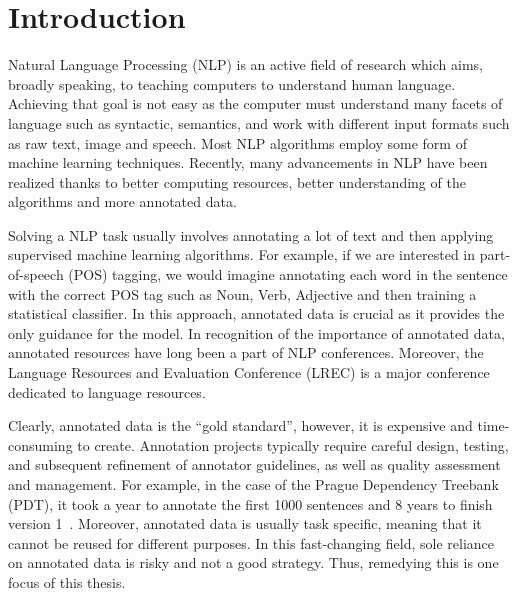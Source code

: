 \documentclass[12pt,twoside,final,hidelinks]{ltthesis}
\theoremstyle{definition}
\begin{document}


\hsp




\chapter{Introduction}
\label{chap:introduction}
Natural Language Processing (NLP) is an active field of research which aims, broadly speaking, to teaching computers to understand human language. Achieving that goal is not easy as the computer must understand many facets of language such as syntactic, semantics, and work with different input formats such as raw text, image and speech. Most NLP algorithms employ some form of machine learning techniques. Recently, many advancements in NLP have been realized thanks to better computing resources, better understanding of the algorithms and more annotated data. 

Solving a NLP task usually involves annotating a lot of text and then applying supervised machine learning algorithms. For example, if we are interested in part-of-speech (POS) tagging, we would imagine annotating each word in the sentence with the correct POS tag such as Noun, Verb, Adjective and then training a statistical classifier. In this approach, annotated data is crucial as it provides the only guidance for the model. In recognition of the importance of annotated data, annotated resources have long been a part of NLP conferences. Moreover, the Language Resources and Evaluation Conference (LREC) is a major conference dedicated to language resources. 

Clearly, annotated data is the ``gold standard'', however, it is expensive and time-consuming to create. Annotation projects typically require careful design, testing, and subsequent refinement of annotator guidelines, as well as quality assessment and management. For example, in the case of the Prague Dependency Treebank (PDT), it took a year to annotate the first 1000 sentences and 8 years to finish version 1~\cite{bohmovahhh:2001}. Moreover, annotated data is 
usually task specific, meaning that it cannot be reused for different purposes. In this fast-changing field, sole reliance on annotated data is risky and not a good strategy. Thus, remedying this is one focus of this thesis. 
\end{document}

